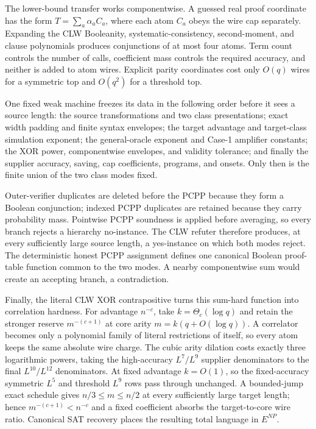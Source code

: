 \documentclass[11pt,letterpaper]{article}
\theoremstyle{definition}
\theoremstyle{remark}
\begin{document}
The lower-bound transfer works componentwise. A guessed real proof
coordinate has the form \(T=\sum_a\alpha_aC_a\), where each atom \(C_a\)
obeys the wire cap separately. Expanding the CLW Booleanity,
systematic-consistency, second-moment, and clause polynomials produces
conjunctions of at most four atoms. Term count controls the number of
calls, coefficient mass controls the required accuracy, and neither is
added to atom wires. Explicit parity coordinates cost only \(O(q)\)
wires for a symmetric top and \(O(q^2)\) for a threshold top.

One fixed weak machine freezes its data in the following order before it sees
a source length: the source transformations and two class presentations;
exact width padding and finite syntax envelopes; the target advantage and
target-class simulation exponent; the general-oracle exponent and Case-1
amplifier constants; the XOR power, componentwise envelopes, and validity
tolerance; and finally the supplier accuracy, saving, cap coefficients,
programs, and onsets. Only then is the finite union of the two class modes
fixed.

Outer-verifier duplicates are deleted before the PCPP because they form
a Boolean conjunction; indexed PCPP duplicates are retained because they
carry probability mass. Pointwise PCPP soundness is applied before
averaging, so every branch rejects a hierarchy no-instance. The CLW
refuter therefore produces, at every sufficiently large source length, a
yes-instance on which both modes reject. The deterministic honest PCPP
assignment defines one canonical Boolean proof-table function common to
the two modes. A nearby componentwise sum would create an accepting
branch, a contradiction.

Finally, the literal CLW XOR contrapositive turns this sum-hard function
into correlation hardness. For advantage \(n^{-c}\), take
\(k=\Theta_c(\log q)\) and retain the stronger reserve \(m^{-(c+1)}\) at
core arity \(m=k(q+O(\log q))\). A correlator becomes only a polynomial
family of literal restrictions of itself, so every atom keeps the same
absolute wire charge. The cubic arity dilation costs exactly three
logarithmic powers, taking the high-accuracy \(L^7/L^9\) supplier
denominators to the final \(L^{10}/L^{12}\) denominators. At fixed
advantage \(k=O(1)\), so the fixed-accuracy symmetric \(L^5\) and
threshold \(L^9\) rows pass through unchanged. A bounded-jump exact
schedule gives \(n/3\le m\le n/2\) at every sufficiently large target
length; hence \(m^{-(c+1)}<n^{-c}\) and a fixed coefficient absorbs the
target-to-core wire ratio. Canonical SAT recovery places the resulting
total language in \(E^{NP}\).
\end{document}
